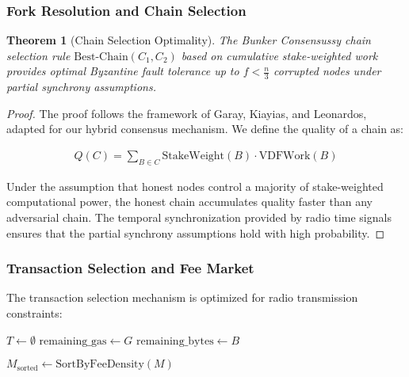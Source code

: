 \documentclass[11pt,a4paper]{article}
\newtheorem{theorem}{Theorem}[section]
\begin{document}
\subsubsection{Fork Resolution and Chain Selection}

\begin{theorem}[Chain Selection Optimality]
The Bunker Consensussy chain selection rule $\text{Best-Chain}(C_1, C_2)$ based on cumulative stake-weighted work provides optimal Byzantine fault tolerance up to $f < \frac{n}{3}$ corrupted nodes under partial synchrony assumptions.
\end{theorem}

\begin{proof}
The proof follows the framework of Garay, Kiayias, and Leonardos, adapted for our hybrid consensus mechanism. We define the quality of a chain as:

\begin{align}
Q(C) = \sum_{B \in C} \text{StakeWeight}(B) \cdot \text{VDFWork}(B)
\end{align}

Under the assumption that honest nodes control a majority of stake-weighted computational power, the honest chain accumulates quality faster than any adversarial chain. The temporal synchronization provided by radio time signals ensures that the partial synchrony assumptions hold with high probability.
\end{proof}

\subsubsection{Transaction Selection and Fee Market}

The transaction selection mechanism is optimized for radio transmission constraints:

\begin{algorithm}[H]
\SetAlgoLined
{}
\caption{Radio-Optimized Transaction Selection}

$T \leftarrow \emptyset$\;
$\text{remaining\_gas} \leftarrow G$\;
$\text{remaining\_bytes} \leftarrow B$\;

$M_{\text{sorted}} \leftarrow \text{SortByFeeDensity}(M)$\;


\;
\end{algorithm}
\end{document}
